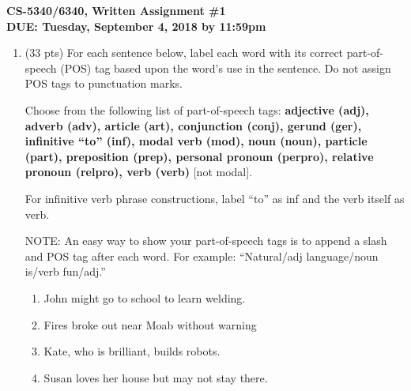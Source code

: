\documentclass[11pt]{article}
\begin{document}
\large
\begin{center}
{\bf CS-5340/6340, Written Assignment \#1} \\
{\bf DUE: Tuesday, September 4, 2018 by 11:59pm}
\end{center}
\normalsize

\begin{enumerate}  


\item (33 pts) For each sentence below, label each word with its
  correct part-of-speech (POS) tag based upon the word's use in the sentence.
  Do not assign POS tags to punctuation marks. 

  Choose from the following list of part-of-speech tags: {\bf
    adjective ({\sc adj}), adverb ({\sc adv}), article ({\sc art}),
    conjunction ({\sc conj}), gerund ({\sc ger}), infinitive ``to''
    ({\sc inf}), modal verb ({\sc mod}), noun ({\sc noun}), particle
    ({\sc part}), preposition ({\sc prep}), personal 
    pronoun ({\sc perpro}), relative pronoun ({\sc relpro}), verb
    ({\sc verb})} [not modal]. 

For infinitive verb phrase constructions, label ``to'' as {\sc inf}
and the verb itself as {\sc verb}. 

NOTE: An easy way to show your part-of-speech tags is to append a
slash and POS tag after each word. For example: ``Natural/{\sc adj}
language/{\sc noun} is/{\sc verb} fun/{\sc adj}.'' \\


\begin{enumerate}

\item John might go to school to learn welding.
\vspace*{.2in}


\item Fires broke out near Moab without warning
\vspace*{.2in}


\item Kate, who is brilliant, builds robots. 
\vspace*{.2in}



\item Susan loves her house but may not stay there.
\vspace*{.2in}




\end{enumerate}
\end{enumerate}
\end{document}
